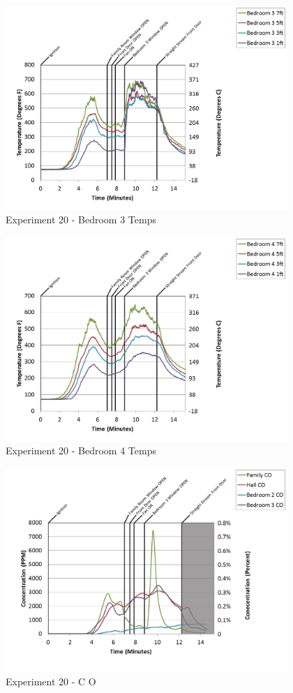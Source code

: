\documentclass{article}
\begin{document}
\begin{appendices}
\begin{figure}[h!]
	\centering
	\includegraphics[height=3.05in]{0_Images/Results_Charts/Exp_20_Charts/Bedroom3Temps.png}
	\caption{Experiment 20 - Bedroom 3 Temps}
\end{figure}

\clearpage

\begin{figure}[h!]
	\centering
	\includegraphics[height=3.05in]{0_Images/Results_Charts/Exp_20_Charts/Bedroom4Temps.png}
	\caption{Experiment 20 - Bedroom 4 Temps}
\end{figure}


\begin{figure}[h!]
	\centering
	\includegraphics[height=3.05in]{0_Images/Results_Charts/Exp_20_Charts/CO.png}
	\caption{Experiment 20 - C O}
\end{figure}


\end{appendices}
\end{document}
